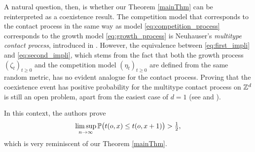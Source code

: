 A natural question, then, is whether our Theorem \ref{mainThm} can be reinterpreted as a coexistence result. The competition model that corresponds to the contact process in the same way as model \eqref{eq:competition_process} corresponds to the growth model \eqref{eq:growth_process} is Neuhauser's \textit{multitype contact process}, introduced in \cite{Neuha92}. However, the equivalence between \eqref{eq:first_impli} and \eqref{eq:second_impli}, which stems from the fact that both the growth process $(\zeta_t)_{t\geq 0}$ and the competition model $(\eta_t)_{t\geq 0}$ are defined from the same random metric, has no evident analogue for the contact process. Proving that the coexistence event has positive probability for the multitype contact process on $\Zd$ is still an open problem, apart from the easiest case of $d=1$ (see \cite{andjel2010survival} and \cite{valesin2010multitype}).

\iffalse

In this context, the authors prove 
\begin{equation}\label{eqHittingFPP}
	\limsup_{n \to \infty} \P\big(t(o,{x}) \le t(o,{ x+1})\big)>\tfrac12, 
\end{equation}
which is very reminiscent of our Theorem \ref{mainThm}. 



